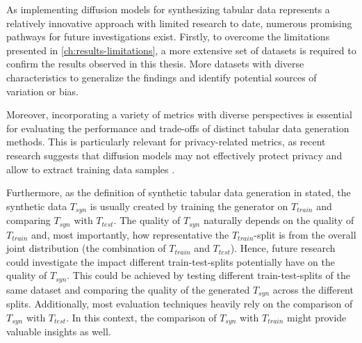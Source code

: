 As implementing diffusion models for synthesizing tabular data represents a relatively innovative approach with limited research to date, numerous promising pathways for future investigations exist.
Firstly, to overcome the limitations presented in \autoref{ch:results-limitations}, a more extensive set of datasets is required to confirm the results observed in this thesis.
More datasets with diverse characteristics to generalize the findings and identify potential sources of variation or bias.

Moreover, incorporating a variety of metrics with diverse perspectives is essential for evaluating the performance and trade-offs of distinct tabular data generation methods.
This is particularly relevant for privacy-related metrics, as recent research suggests that diffusion models may not effectively protect privacy and allow to extract training data samples \cite{carlini2023ExtractingTrainingData}.

Furthermore, as the definition of synthetic tabular data generation in  stated, the synthetic data $T_{syn}$ is usually created by training the generator on $T_{train}$ and comparing $T_{syn}$ with $T_{test}$.
The quality of $T_{syn}$ naturally depends on the quality of $T_{train}$ and, most importantly, how representative the $T_{train}$-split is from the overall joint distribution (the combination of $T_{train}$ and $T_{test}$).
Hence, future research could investigate the impact different train-test-splits potentially have on the quality of $T_{syn}$.
This could be achieved by testing different train-test-splits of the same dataset and comparing the quality of the generated $T_{syn}$ across the different splits.
Additionally, most evaluation techniques heavily rely on the comparison of $T_{syn}$ with $T_{test}$.
In this context, the comparison of $T_{syn}$ with $T_{train}$ might provide valuable insights as well.

